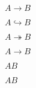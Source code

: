 \documentclass{article}
\newcommand{\longhookrightarrow}{}%
\DeclareRobustCommand{\longhookrightarrow}{\lhook\joinrel\relbar\joinrel\rightarrow}
\newcommand{\longtwoheadrightarrow}{}%
\DeclareRobustCommand{\longtwoheadrightarrow}{\relbar\joinrel\twoheadrightarrow}
\begin{document}
$A \rightarrow B$

$A \hookrightarrow B$

$A \twoheadrightarrow B$

$A \longrightarrow B$

$A \longhookrightarrow B$

$A \longtwoheadrightarrow B$
\end{document}
